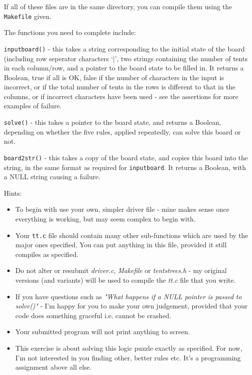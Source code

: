 \begin{exercise}
\noindent If all of these files are in the same directory, you can
compile them using the \verb^Makefile^ given.

\noindent The functions you need to complete include:

\verb^inputboard()^ - this takes a string corresponding to the initial
state of the board (including row seperator characters `|',
two strings containing the number of tents in each
column/row, and a pointer to the board state to be filled in. It returns
a Boolean, true if all is OK, false if the number of characters in the
input is incorrect, or if the total number of tents in the rows is
different to that in the columns, or if incorrect characters have been
used - see the assertions for more examples of failure.

\verb^solve()^ - this takes a pointer to the board state, and returns
a Boolean, depending on whether the five rules, applied repeatedly,
can solve this board or not.

\verb^board2str()^ - this takes a copy of the board state, and
copies this board into the string, in the same format as required for
\verb^inputboard^. It returns a Boolean, with a NULL string causing
a failure.

\noindent Hints:
\begin{itemize}

\item To begin with use your own, simpler driver file - mine makes sense
once everything is working, but may seem complex to begin with.

\item Your \verb^tt.c^ file should contain many other sub-functions
which are used by the major ones specified. You can put anything in this
file, provided it still compiles as specified.

\item Do not alter or resubmit {\em driver.c}, {\em Makefile} or
{\em tentstrees.h} - my original versions (and variants) will be
used to compile the {\em tt.c} file that you write.

\item If you have questions such as {\em "What happens if a NULL pointer is passed
to solve()"} - I'm happy for you to make your own judgement, provided that your code
does something graceful i.e. cannot be crashed.

\item Your submitted program will not print anything to screen.

\item This exercise is about solving this logic puzzle exactly as specified.
For now, I'm not interested in you finding other, better rules etc. It's a programming assignment
above all else.

\end{itemize}

\end{exercise}
